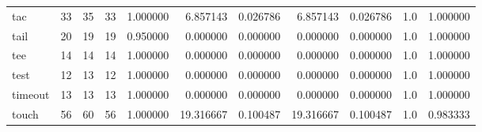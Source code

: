 \begin{tabular}{lrrrrrrrrrr}
tac       &                                      33 &                 35 &                                33 &                                   1.000000 &                               6.857143 &                                     0.026786 &                          6.857143 &                                0.026786 &                                1.0 &                                           1.000000 \\
tail      &                                      20 &                 19 &                                19 &                                   0.950000 &                               0.000000 &                                     0.000000 &                          0.000000 &                                0.000000 &                                1.0 &                                           1.000000 \\
tee       &                                      14 &                 14 &                                14 &                                   1.000000 &                               0.000000 &                                     0.000000 &                          0.000000 &                                0.000000 &                                1.0 &                                           1.000000 \\
test      &                                      12 &                 13 &                                12 &                                   1.000000 &                               0.000000 &                                     0.000000 &                          0.000000 &                                0.000000 &                                1.0 &                                           1.000000 \\
timeout   &                                      13 &                 13 &                                13 &                                   1.000000 &                               0.000000 &                                     0.000000 &                          0.000000 &                                0.000000 &                                1.0 &                                           1.000000 \\
touch     &                                      56 &                 60 &                                56 &                                   1.000000 &                              19.316667 &                                     0.100487 &                         19.316667 &                                0.100487 &                                1.0 &                                           0.983333 \\

\end{tabular}
